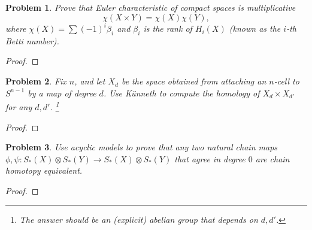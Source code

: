 \documentclass[11pt]{article}
\newtheorem{problem}{Problem}
\begin{document}
\pagebreak 


\begin{problem}
Prove that Euler characteristic of compact spaces is multiplicative 
\[\chi(X\times Y)=\chi(X)\chi(Y),\] where $\chi(X)=\sum(-1)^i\beta_i$ and $\beta_i$ is the rank of $H_i(X)$ (known as the $i$-th Betti number).
\end{problem}

\begin{proof}

\end{proof}

\pagebreak 


\begin{problem}
Fix $n$, and let $X_d$ be the space obtained from attaching an $n$-cell to $S^{n-1}$ by a map of degree $d$. Use K\"unneth to compute the homology of $X_d\times X_{d'}$ for any $d,d'$. \footnote{The answer should be an (explicit) abelian group that depends on $d,d'$.} 
\end{problem}

\begin{proof}

\end{proof}


\pagebreak 

\begin{problem}
Use acyclic models to prove that any two natural chain maps $\phi,\psi:S_*(X)\otimes S_*(Y)\to S_*(X)\otimes S_*(Y)$ that agree in degree $0$ are chain homotopy equivalent. 
\end{problem}

\begin{proof}

\end{proof}
\end{document}
